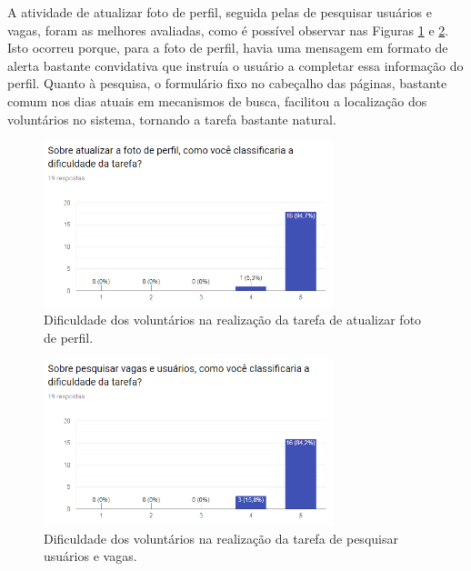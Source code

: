 A atividade de atualizar foto de perfil, seguida pelas de pesquisar usuários e vagas, foram as melhores avaliadas, como é possível observar nas Figuras \ref{avalGrafTUPerfil} e \ref{avalGrafTUPesquisar}. Isto ocorreu porque, para a foto de perfil, havia uma mensagem em formato de alerta bastante convidativa que instruía o usuário a completar essa informação do perfil. Quanto à pesquisa, o formulário fixo no cabeçalho das páginas, bastante comum nos dias atuais em mecanismos de busca, facilitou a localização dos voluntários no sistema, tornando a tarefa bastante natural.

\begin{figure}[h]
    \caption{Dificuldade dos voluntários na realização da tarefa de atualizar foto de perfil.}
       	\begin{center}
            \includegraphics[width=0.75\textwidth]{figuras/avaliacao/pdv-1.png}
        \end{center}
    \label{avalGrafTUPerfil}
\end{figure} 

\begin{figure}[H]
    \caption{Dificuldade dos voluntários na realização da tarefa de pesquisar usuários e vagas.}
       	\begin{center}
            \includegraphics[width=0.75\textwidth]{figuras/avaliacao/pdv-5.png}
        \end{center}
    \label{avalGrafTUPesquisar}
\end{figure} 


